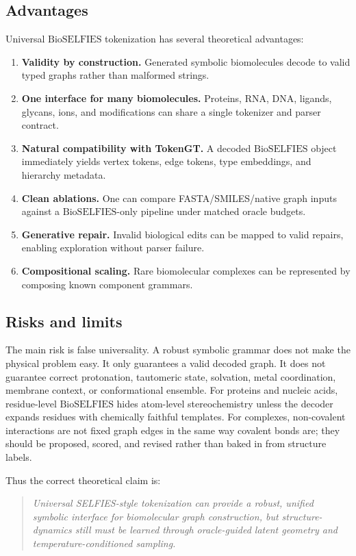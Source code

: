 \documentclass[11pt]{article}
\newcommand{\bioselfies}{\mathrm{BioSELFIES}}
\begin{document}
\subsection{Advantages}

Universal $\bioselfies$ tokenization has several theoretical advantages:
\begin{enumerate}[leftmargin=2em]
  \item \textbf{Validity by construction.} Generated symbolic biomolecules decode to valid typed graphs rather than malformed strings.
  \item \textbf{One interface for many biomolecules.} Proteins, RNA, DNA, ligands, glycans, ions, and modifications can share a single tokenizer and parser contract.
  \item \textbf{Natural compatibility with TokenGT.} A decoded $\bioselfies$ object immediately yields vertex tokens, edge tokens, type embeddings, and hierarchy metadata.
  \item \textbf{Clean ablations.} One can compare FASTA/SMILES/native graph inputs against a $\bioselfies$-only pipeline under matched oracle budgets.
  \item \textbf{Generative repair.} Invalid biological edits can be mapped to valid repairs, enabling exploration without parser failure.
  \item \textbf{Compositional scaling.} Rare biomolecular complexes can be represented by composing known component grammars.
\end{enumerate}

\subsection{Risks and limits}

The main risk is false universality. A robust symbolic grammar does not make the physical problem easy. It only guarantees a valid decoded graph. It does not guarantee correct protonation, tautomeric state, solvation, metal coordination, membrane context, or conformational ensemble. For proteins and nucleic acids, residue-level $\bioselfies$ hides atom-level stereochemistry unless the decoder expands residues with chemically faithful templates. For complexes, non-covalent interactions are not fixed graph edges in the same way covalent bonds are; they should be proposed, scored, and revised rather than baked in from structure labels.

Thus the correct theoretical claim is:
\begin{quote}
\emph{Universal SELFIES-style tokenization can provide a robust, unified symbolic interface for biomolecular graph construction, but structure-dynamics still must be learned through oracle-guided latent geometry and temperature-conditioned sampling.}
\end{quote}
\end{document}
